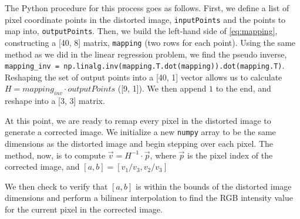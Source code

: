 \documentclass[11pt,a4paper]{article}
\begin{document}
\pagebreak

The Python procedure for this process goes as follows. First, we define a list of pixel coordinate points in the distorted image, \verb|inputPoints| and the points to map into, \verb|outputPoints|. Then, we build the left-hand side of \eqref{eq:mapping}, constructing a [40, 8] matrix, \verb|mapping| (two rows for each point). Using the same method as we did in the linear regression problem, we find the pseudo inverse, \verb|mapping_inv = np.linalg.inv(mapping.T.dot(mapping)).dot(mapping.T)|. Reshaping the set of output points into a [40, 1] vector allows us to calculate $H = mapping_{inv} \cdot outputPoints$ ([9, 1]). We then append $1$ to the end, and reshape into a [3, 3] matrix.

At this point, we are ready to remap every pixel in the distorted image to generate a corrected image. We initialize a new \verb|numpy| array to be the same dimensions as the distorted image and begin stepping over each pixel. The method, now, is to compute $\vec{v} = H^{-1} \cdot \vec{p}$, where $\vec{p}$ is the pixel index of the corrected image, and $[a,b] = [v_1/v_3, v_2/v_3]$

We then check to verify that $[a,b]$ is within the bounds of the distorted image dimensions and perform a bilinear interpolation to find the RGB intensity value for the current pixel in the corrected image.

\pagebreak
\end{document}
